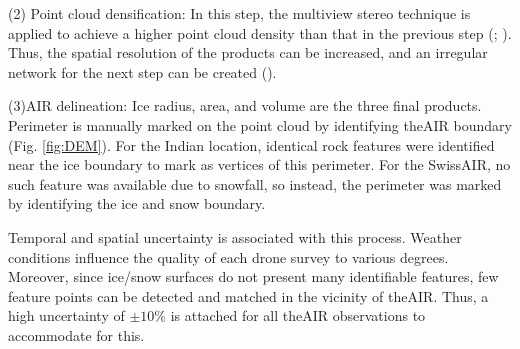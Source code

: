 (2) Point cloud densification: In this step, the multiview stereo technique is applied to achieve a higher
point cloud density than that in the previous step (\cite{furukawaAccurateDenseRobust2010};
\cite{molgStructurefromMotionUsingHistorical2017}). Thus, the spatial resolution of the products can be
increased, and an irregular network for the next step can be created (\cite{kungACCURACYAUTOMATICPHOTOGRAMMETRIC2011}).

(3)\ac{AIR} delineation: Ice radius, area, and volume are the three final products. Perimeter is manually marked
on the point cloud by identifying the\ac{AIR} boundary (Fig. \ref{fig:DEM}). For the Indian location, identical rock features were identified
near the ice boundary to mark as vertices of this perimeter. For the Swiss\ac{AIR}, no such feature was available due
to snowfall, so instead, the perimeter was marked by identifying the ice and snow boundary.

Temporal and spatial uncertainty is associated with this process. Weather conditions influence the quality
of each drone survey to various degrees. Moreover, since ice/snow surfaces do not present many identifiable features, few
feature points can be detected and matched in the vicinity of the\ac{AIR}. Thus, a high uncertainty of
$\pm 10 \%$ is attached for all the\ac{AIR} observations to accommodate for this.

